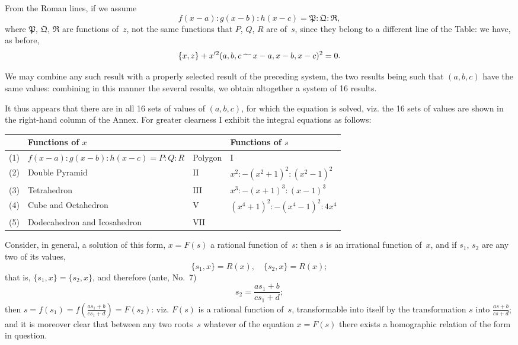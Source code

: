 \documentclass[11pt,a4paper]{book}
\begin{document}
\begin{art}
From the Roman lines, if we assume
\[
f(x-a) : g(x-b) : h(x-c) = \mathfrak{P} : \mathfrak{Q} : \mathfrak{R},
\]
where $\mathfrak{P}$, $\mathfrak{Q}$, $\mathfrak{R}$ are functions of~$z$, not the
same functions that $P$, $Q$, $R$ are of~$s$, since they belong to a
different line of the Table: we have, as before,
\[
\{x, z\} + x'^2 (a, b, c \,\raisebox{-.5ex}{$\widetilde{\phantom{aa}}$}\, x-a, x-b, x-c)^2 = 0.
\]
\end{art}

\begin{art}
We may combine any such result with a properly selected result of the
preceding system, the two results being such that $(a, b, c)$ have the
same values: combining in this manner the several results, we obtain
altogether a system of 16 results.
\end{art}

\begin{art}
It thus appears that there are in all 16 sets of values of $(a, b, c)$,
for which the equation is solved, viz. the 16 sets of values are shown in
the right-hand column of the Annex. For greater clearness I exhibit the
integral equations as follows:

\begin{center}
\begin{tabular}{|l|l|l|l|}
\hline
& Functions of $x$ & & Functions of $s$ \\
\hline
(1) & $f(x-a) : g(x-b) : h(x-c) = P : Q : R$ & Polygon & I \\
(2) & Double Pyramid & II & $x^2 : -(x^2+1)^2 : (x^2-1)^2$ \\
(3) & Tetrahedron & III & $x^3 : -(x+1)^3 : (x-1)^3$ \\
(4) & Cube and Octahedron & V & $(x^4+1)^2 : -(x^4-1)^2 : 4x^4$ \\
(5) & Dodecahedron and Icosahedron & VII & \\
\hline
\end{tabular}
\end{center}
\end{art}

\begin{art}
Consider, in general, a solution of this form, $x = F(s)$ a rational
function of~$s$: then $s$ is an irrational function of~$x$, and if
$s_1$, $s_2$ are any two of its values,
\[
\{s_1, x\} = R(x), \quad \{s_2, x\} = R(x);
\]
that is, $\{s_1, x\} = \{s_2, x\}$, and therefore (ante, No.~7)
\[
s_2 = \frac{as_1 + b}{cs_1 + d};
\]
then $s = f(s_1) = f\left(\frac{as_1+b}{cs_1+d}\right) = F(s_2)$: viz. $F(s)$ is a
rational function of~$s$, transformable into itself by the transformation
$s$ into $\frac{as+b}{cs+d}$; and it is moreover clear that between any two
roots~$s$ whatever of the equation $x = F(s)$ there exists a homographic
relation of the form in question.
\end{art}
\end{document}
